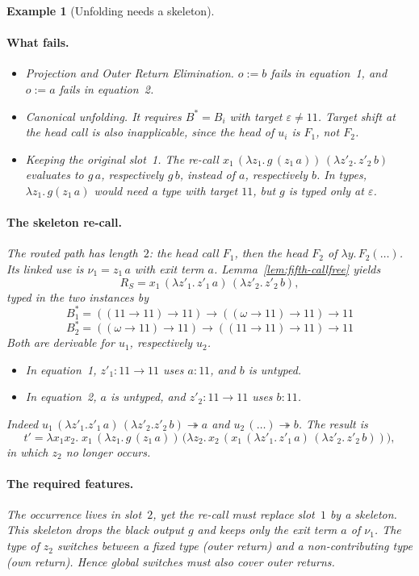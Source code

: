\documentclass[10pt,a4paper]{article}
\theoremstyle{plain}%
\newtheorem{example}[theorem]{Example}
\begin{document}
\begin{example}[Unfolding needs a skeleton]
\paragraph{What fails.}
\begin{itemize}
\item \emph{Projection and Outer Return Elimination.}
$o := b$ fails in equation~1, and $o := a$ fails in equation~2.
\item \emph{Canonical unfolding.}
It requires $B^* = B_i$ with target $\varepsilon \ne 11$.
Target shift at the head call is also inapplicable, since the head of $u_i$ is $F_1$, not $F_2$.
\item \emph{Keeping the original slot~1.}
The re-call $x_1\,(\lambda z_1.\,g\,(z_1\,a))\,(\lambda z'_2.\,z'_2\,b)$ evaluates to $g\,a$, respectively $g\,b$, instead of $a$, respectively $b$.
In types, $\lambda z_1.\,g(z_1\,a)$ would need a type with target $11$, but $g$ is typed only at $\varepsilon$.
\end{itemize}

\paragraph{The skeleton re-call.}
The routed path has length~$2$: the head call $F_1$, then the head $F_2$ of $\lambda y.\,F_2(\ldots)$.
Its linked use is $\nu_1 = z_1\,a$ with exit term $a$.
Lemma~\ref{lem:fifth-callfree} yields
\[
R_S = x_1\,(\lambda z'_1.\,z'_1\,a)\,(\lambda z'_2.\,z'_2\,b),
\]
typed in the two instances by
\[
B^*_1 = ((11 \to 11) \to 11) \to ((\omega \to 11) \to 11) \to 11
\]
\[
B^*_2 = ((\omega \to 11) \to 11) \to ((11 \to 11) \to 11) \to 11
\]
Both are derivable for $u_1$, respectively $u_2$.
\begin{itemize}
\item In equation~1, $z'_1 : 11 \to 11$ uses $a : 11$, and $b$ is untyped.
\item In equation~2, $a$ is untyped, and $z'_2 : 11 \to 11$ uses $b : 11$.
\end{itemize}
Indeed $u_1\,(\lambda z'_1.z'_1\,a)\,(\lambda z'_2.z'_2\,b) \twoheadrightarrow a$ and $u_2\,(\ldots) \twoheadrightarrow b$.
The result is
\[
t' = \lambda x_1 x_2.\; x_1\,(\lambda z_1.\,g\,(z_1\,a))\,\big(\lambda z_2.\,x_2\,(x_1\,(\lambda z'_1.\,z'_1\,a)\,(\lambda z'_2.\,z'_2\,b))\big),
\]
in which $z_2$ no longer occurs.

\paragraph{The required features.}
The occurrence lives in slot~$2$, yet the re-call must replace slot~$1$ by a skeleton.
This skeleton drops the black output $g$ and keeps only the exit term $a$ of $\nu_1$.
The type of $z_2$ switches between a fixed type (outer return) and a non-contributing type (own return).
Hence global switches must also cover outer returns.
\end{example}
\end{document}
